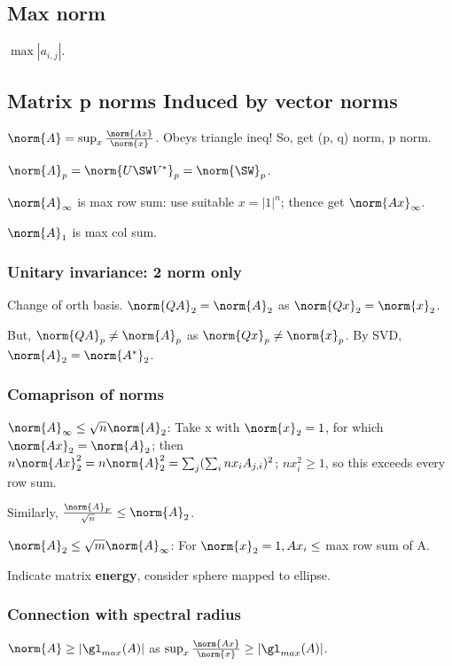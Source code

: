 \documentclass[oneside, article]{memoir}
\begin{document}
\subsection{Max norm}
$\max |a_{i,j}|$.

\subsection{Matrix p norms Induced by vector norms}
$\norm{A} = \sup_{x} \frac{\norm{Ax}}{\norm{x}}$. Obeys triangle ineq! So, get (p, q) norm, p norm.

$\norm{A}_{p} = \norm{U\SW V^{*}}_{p} = \norm{\SW}_{p}$. 

$\norm{A}_{\infty}$ is max row sum: use suitable $x = |1|^{n}$; thence get $\norm{Ax}_{\infty}$.

$\norm{A}_{1}$ is max col sum.

\subsubsection{Unitary invariance: 2 norm only}
Change of orth basis. $\norm{QA}_{2}=\norm{A}_{2}$ as $\norm{Qx}_{2}=\norm{x}_{2}$.

But, $\norm{QA}_{p} \neq \norm{A}_{p}$ as $\norm{Qx}_{p} \neq \norm{x}_{p}$. By SVD, $\norm{A}_{2} = \norm{A^{*}}_{2}$.

\subsubsection{Comaprison of norms}
$\norm{A}_{\infty} \leq \sqrt{n}\norm{A}_{2}$: Take x with $\norm{x}_{2} = 1$, for which $\norm{Ax}_{2} = \norm{A}_{2}$; then $n\norm{Ax}_{2}^{2} = n\norm{A}_{2}^{2} = \sum_{j}(\sum_{i}nx_{i}A_{j,i})^{2}$; $nx_{i}^{2} \geq 1$, so this exceeds every row sum.

Similarly, $\frac{\norm{A}_{F}}{\sqrt{n}} \leq \norm{A}_{2}$.

$\norm{A}_{2} \leq \sqrt{m}\norm{A}_{\infty}$: For $\norm{x}_{2}=1, {Ax}_{i} \leq $ max row sum of A.

Indicate matrix \textbf{energy}, consider sphere mapped to ellipse.

\subsubsection{Connection with spectral radius}
$\norm{A} \geq |\gl_{max}(A)|$ as $\sup_x \frac{\norm{Ax}}{\norm{x}} \geq |\gl_{max}(A)|$. 
\end{document}

